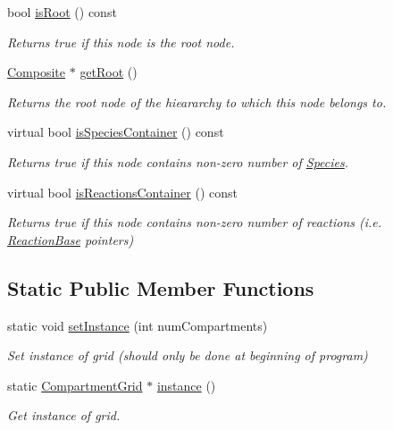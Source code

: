 \begin{DoxyCompactItemize}
bool \hyperlink{classComponent_a4f0bed8144509d6565a30b548fac0fe7}{is\+Root} () const 
\begin{DoxyCompactList}\small\item\em Returns true if this node is the root node. \end{DoxyCompactList}\item 
\hyperlink{classComposite}{Composite} $\ast$ \hyperlink{classComponent_abcb3746cb8b4afcecf437dce40c0c772}{get\+Root} ()
\begin{DoxyCompactList}\small\item\em Returns the root node of the hieararchy to which this node belongs to. \end{DoxyCompactList}\item 
virtual bool \hyperlink{classComponent_a0daf865ff32aff9e68316c65b681cbf9}{is\+Species\+Container} () const 
\begin{DoxyCompactList}\small\item\em Returns true if this node contains non-\/zero number of \hyperlink{classSpecies}{Species}. \end{DoxyCompactList}\item 
virtual bool \hyperlink{classComponent_a506e080028078ef9a753d854c60904a3}{is\+Reactions\+Container} () const 
\begin{DoxyCompactList}\small\item\em Returns true if this node contains non-\/zero number of reactions (i.\+e. \hyperlink{classReactionBase}{Reaction\+Base} pointers) \end{DoxyCompactList}\end{DoxyCompactItemize}
\subsection*{Static Public Member Functions}
\begin{DoxyCompactItemize}
\item 
static void \hyperlink{classCompartmentGrid_a9ad80c9605a524cda4a018b93bdefeb6}{set\+Instance} (int num\+Compartments)
\begin{DoxyCompactList}\small\item\em Set instance of grid (should only be done at beginning of program) \end{DoxyCompactList}\item 
static \hyperlink{classCompartmentGrid}{Compartment\+Grid} $\ast$ \hyperlink{classCompartmentGrid_a67c532a92e0144cac52282cf34a920f0}{instance} ()
\begin{DoxyCompactList}\small\item\em Get instance of grid. \end{DoxyCompactList}\end{DoxyCompactItemize}
